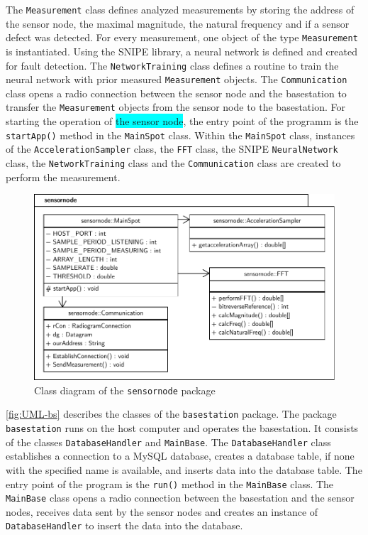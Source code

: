 \documentclass[12pt,a4paper]{scrartcl}
\begin{document}
The \texttt{Measure\-ment} class defines analyzed measurements by storing the address of the sensor node, the maximal magnitude, the natural frequency and if a sensor defect was detected.
For every measurement, one object of the type \texttt{Measure\-ment} is instantiated.
Using the SNIPE library, a neural network is defined and created for fault detection.
The \texttt{Network\-Training} class defines a routine to train the neural network with prior measured \texttt{Measure\-ment} objects.
The \texttt{Communi\-cation} class opens a radio connection between the sensor node and the basestation to transfer the \texttt{Measure\-ment} objects from the sensor node to the basestation.
For starting the operation of \colorbox{cyan}{the sensor node}, the entry point of the programm is the \texttt{start\-App()} method in the \texttt{Main\-Spot} class. 
Within the \texttt{Main\-Spot} class, instances of the \texttt{Acceleration\-Sampler} class, the \texttt{FFT} class, the SNIPE \texttt{Neural\-Network} class, the \texttt{Network\-Training} class and the \texttt{Communi\-cation} class are created to perform the measurement.

\begin{figure}[htb]
    \centering
    \includegraphics[width = \textwidth]{figures/uml-sensornode.pdf}
    \caption{Class diagram of the \texttt{sensornode} package}
    \label{fig:UML-sn}
\end{figure}

\autoref{fig:UML-bs} describes the classes of the \texttt{base\-station} package.
The package \texttt{base\-station} runs on the host computer and operates the basestation.
It consists of the classes \texttt{Database\-Handler} and \texttt{Main\-Base}.
The \texttt{Database\-Handler} class establishes a connection to a MySQL database, creates a database table, if none with the specified name is available, and inserts data into the database table.
The entry point of the program is the \texttt{run()} method in the \texttt{Main\-Base} class. The \texttt{Main\-Base} class opens a radio connection between the basestation and the sensor nodes, receives data sent by the sensor nodes and creates an instance of \texttt{Database\-Handler} to insert the data into the database.
\end{document}
